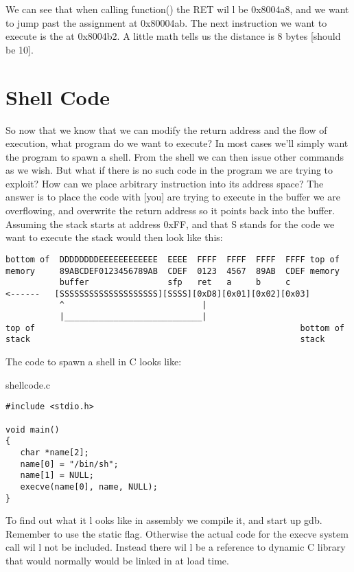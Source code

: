 \documentclass[10pt]{article}
\begin{document}
We can see that when calling function() the RET wil l be 0x8004a8, and we want to jump past the assignment at 
0x80004ab. The next instruction we want to execute is the at 0x8004b2. A little math tells us the distance is 8 
bytes [should be 10]. 

\section{Shell Code}

So now that we know that we can modify the return address and the flow of execution, what program do we 
want to execute? In most cases we'll simply want the program to spawn a shell. From the shell we can then issue 
other commands as we wish. But what  if there is no such code in the program we are trying to exploit? How can 
we place arbitrary instruction into its address space? The answer is to place the code with [you] are trying to 
execute in the buffer we are overflowing, and overwrite the return address so it points back into the buffer. 
Assuming the stack starts at address 0xFF, and that S stands for the code we want to execute the stack would 
then look like this:

{\scriptsize
\begin{verbatim}
bottom of  DDDDDDDDEEEEEEEEEEEE  EEEE  FFFF  FFFF  FFFF  FFFF top of
memory     89ABCDEF0123456789AB  CDEF  0123  4567  89AB  CDEF memory           
           buffer                sfp   ret   a     b     c
<------   [SSSSSSSSSSSSSSSSSSSS][SSSS][0xD8][0x01][0x02][0x03]
           ^                            |
           |____________________________|
top of                                                      bottom of
stack                                                       stack
\end{verbatim}
}
  

The code to spawn a shell in C looks like:

shellcode.c

\begin{lstlisting}
#include <stdio.h>

void main() 
{
   char *name[2];
   name[0] = "/bin/sh";
   name[1] = NULL;
   execve(name[0], name, NULL);
}
\end{lstlisting}

To find out what it l ooks like in assembly we compile it, and start up gdb. Remember to use the  static flag. 
Otherwise the actual code  for the execve system call wil l not be included. Instead there wil l be a reference to 
dynamic C library that would normally would be linked in at load time. 
\end{document}
